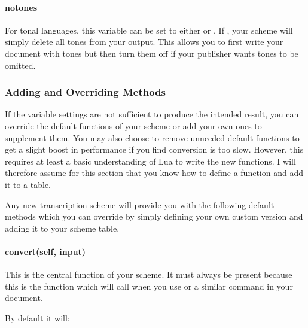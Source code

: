 \documentclass{ltxdockit}
\begin{document}
\paragraph{no\textunderscore{}tones}

For tonal languages, this variable can be set to either  or
. If , your scheme will simply delete all tones from your
output. This allows you to first write your document with tones but then turn
them off if your publisher wants tones to be omitted.

\subsubsection{Adding and Overriding Methods}

If the variable settings are not sufficient to produce the intended result, you
can override the default functions of your scheme or add your own ones to
supplement them. You may also choose to remove unneeded default functions to get
a slight boost in performance if you find conversion is too slow. However, this
requires at least a basic understanding of Lua to write the new functions. I
will therefore assume for this section that you know how to define a function
and add it to a table.


Any new transcription scheme will provide you with the following default methods
which you can override by simply defining your own custom version and adding it
to your scheme table.

\paragraph{convert(self, input)}

This is the central function of your scheme. It must always be present because
this is the function which \transconv{} will call when you use
 or a similar command in your document.

By default it will:
\end{document}
